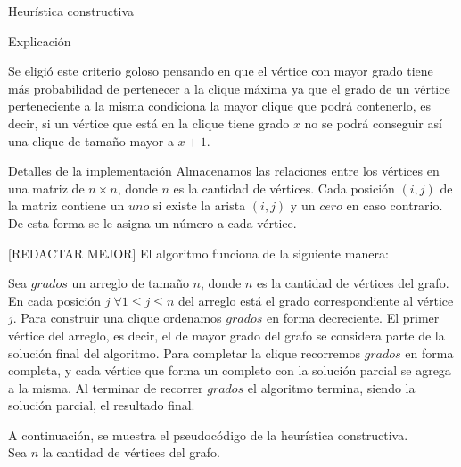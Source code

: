 \begin{section}{Heurística constructiva}
\begin{subsection}{Explicación}

			Se eligió este criterio goloso pensando en que el vértice con mayor grado tiene más probabilidad de pertenecer a la clique máxima ya que el grado de un vértice perteneciente a la misma condiciona la mayor clique que podrá contenerlo, es decir, si un vértice que está en la clique tiene grado $x$ no se podrá conseguir así una clique de tamaño mayor a $x+1$.
		\end{subsection}
		\begin{subsection}{Detalles de la implementación}
			Almacenamos las relaciones entre los vértices en una matriz de $n \times n$, donde $n$ es la cantidad de vértices. Cada posición $(i,j)$ de la matriz contiene un $uno$ si existe la arista $(i,j)$ y un $cero$ en caso contrario. De esta forma se le asigna un número a cada vértice.\VSP

			[REDACTAR MEJOR]
			El algoritmo funciona de la siguiente manera:

			Sea $grados$ un arreglo de tamaño $n$, donde $n$ es la cantidad de vértices del grafo. En cada posición $j\; \forall 	1\leq j \leq n$ del arreglo está el grado correspondiente al vértice $j$.
			Para construir una clique ordenamos $grados$ en forma decreciente. El primer vértice del arreglo, es decir, el de mayor grado del grafo se considera parte de la solución final del algoritmo.
			Para completar la clique recorremos $grados$ en forma completa, y cada vértice que forma un completo con la solución parcial se agrega a la misma.
			Al terminar de recorrer $grados$ el algoritmo termina, siendo la solución parcial, el resultado final.

			A continuación, se muestra el pseudocódigo de la heurística constructiva.\\

			Sea $n$ la cantidad de vértices del grafo.


\end{subsection}
\end{section}
